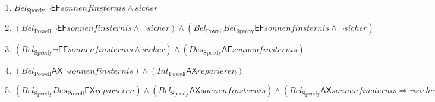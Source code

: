 \newcommand{\bdia}{\mathsf{A}}
\newcommand{\bdie}{\mathsf{E}}
\newcommand{\bdil}[1]{\mathit{#1}}
\newcommand{\bdif}{\mathit{\mathsf{F}}}
\newcommand{\bdix}{\mathit{\mathsf{X}}}

\newcommand{\bdibel}[1]{Bel_\text{#1}}
\newcommand{\bdides}[1]{Des_\text{#1}}
\newcommand{\bdiint}[1]{Int_\text{#1}}

\begin{enumerate}[label=\alph*)]
	\item
	$\bdibel{Speedy}\neg\bdie\bdif\bdil{sonnenfinsternis}\wedge\bdil{sicher}$

	\item
	$(\bdibel{Powell}\neg\bdie\bdif\bdil{sonnenfinsternis}\wedge\neg\bdil{sicher})\wedge(\bdibel{Powell}\bdibel{Speedy}\bdie\bdif\bdil{sonnenfinsternis}\wedge\neg\bdil{sicher})$	
	
	\item
	$(\bdibel{Speedy}\neg\bdie\bdif\bdil{sonnenfinsternis}\wedge\bdil{sicher})\wedge(\bdides{Speedy}\bdia\bdif\bdil{sonnenfinsternis}) $
	
	\item
	$(\bdibel{Powell}\bdia\bdix\neg\bdil{sonnenfinsternis})\wedge(\bdiint{Powell}\bdia\bdix\bdil{reparieren})$
%	
%	
%	
	\item
	$(\bdibel{Speedy}\bdides{Powell}\bdie\bdix\bdil{reparieren})\wedge(\bdibel{Speedy}\bdia\bdix\bdil{sonnenfinsternis})\wedge(\bdibel{Speedy}\bdia\bdix\bdil{sonnenfinsternis}\Rightarrow\neg\bdil{sicher})$
%	
\end{enumerate}